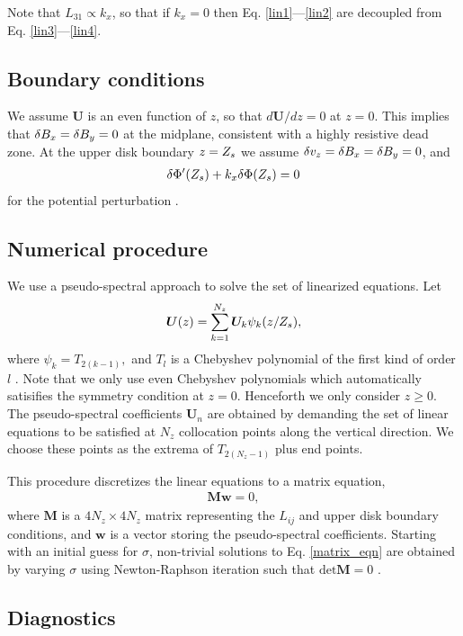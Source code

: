 Note that $L_{31}\propto k_x$, so that if $k_x=0$ 
then Eq. \ref{lin1}---\ref{lin2} are decoupled from 
Eq. \ref{lin3}---\ref{lin4}. 

\subsection{Boundary conditions}
We assume $\bm{U}$ is an even function of $z$, so that $d\bm{U}/dz=0$
at $z=0$. This implies that $\delta B_x=\delta B_y=0$ at the midplane, consistent
with a highly resistive dead zone. At the upper disk boundary
$z=Z_s$ we assume 
$\delta v_z=\delta B_x=\delta B_y=0$, and 
\begin{align}
  \delta \Phi^\prime(Z_s) + k_x\delta \Phi(Z_s) = 0
\end{align}
for the potential perturbation \citep[see][]{goldreich65a}.  

\subsection{Numerical procedure}
We use a pseudo-spectral approach to solve the set of linearized
equations. Let
\begin{align}\label{cheby_expand}
  \bm{U}(z) 
  = \sum_{k=1}^{N_z} \bm{U}_k\psi_k(z/Z_s), 
\end{align}
where $  \psi_k  = T_{2(k-1)},  $ and  $T_l$ is a Chebyshev polynomial of the first
kind of order $l$ \citep{stegun65}. %
Note that we only use even Chebyshev polynomials which automatically satisifies the symmetry 
condition at $z=0$. Henceforth we only consider $z\geq 0$. 
The pseudo-spectral coefficients $\bm{U}_n$  are obtained by demanding
the set of linear equations to be satisfied at $N_z$ collocation
points along the vertical direction. We choose these points as the
extrema of $T_{2(N_z-1)}$ plus end points. 

This procedure discretizes the linear equations to a matrix equation,
\begin{align}\label{matrix_eqn}
\bm{M}\bm{w} = 0, 
\end{align}
where $\bm{M}$ is a $4N_z\times 4 N_z$ matrix representing the $L_{ij}$ 
and upper disk boundary conditions, 
and $\bm{w}$ is a vector storing the pseudo-spectral coefficients. 
Starting with an initial guess for $\sigma$, non-trivial solutions to
Eq. \ref{matrix_eqn} are obtained by varying $\sigma$ using Newton-Raphson iteration 
such that $\mathrm{det}\bm{M}=0$ \citep[details can be found in][]{lin12}.

\subsection{Diagnostics}


 
